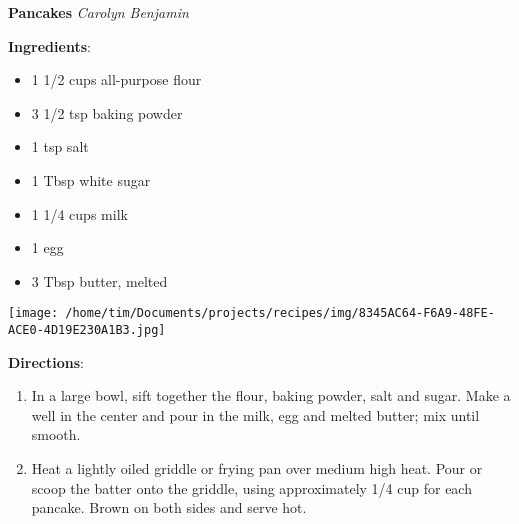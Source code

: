 \documentclass[11pt, twoside, openany]{book}
\begin{document}
\noindent\begin{minipage}[t]{\linewidth}%
{\Large\textbf{Pancakes}} \label{pancakes}\hfill\textit{Carolyn Benjamin}\\
\noindent\begin{minipage}[t]{0.78\linewidth}%
\textbf{Ingredients}:\vspace{-3mm}
\begin{multicols}{2}
\begin{itemize}\setlength\itemsep{-1mm}
\item 1 1/2 cups all-purpose flour
\item 3 1/2 tsp baking powder
\item 1 tsp salt
\item 1 Tbsp white sugar
\item 1 1/4 cups milk
\item 1 egg
\item 3 Tbsp butter, melted
\end{itemize}
\end{multicols}
\end{minipage}
\noindent\begin{minipage}[t]{0.18\linewidth}
\centering \strut\vspace*{-\baselineskip}\newline
\texttt{[image: /home/tim/Documents/projects/recipes/img/8345AC64-F6A9-48FE-ACE0-4D19E230A1B3.jpg]}\\
\end{minipage}\vspace{3mm}
\textbf{Directions}:
\vspace{-3mm}\begin{enumerate}\setlength\itemsep{-1mm}
\item In a large bowl, sift together the flour, baking powder, salt and sugar. Make a well in the center and pour in the milk, egg and melted butter; mix until smooth.
\item Heat a lightly oiled griddle or frying pan over medium high heat. Pour or scoop the batter onto the griddle, using approximately 1/4 cup for each pancake. Brown on both sides and serve hot.
\end{enumerate}
\end{minipage}\vspace{8mm}
\end{document}
